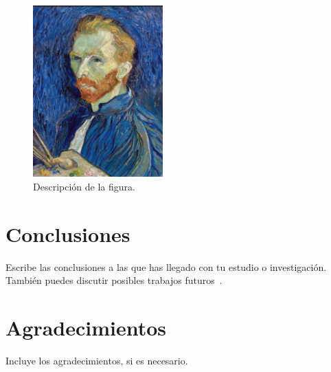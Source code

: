\begin{figure}[htbp]
  \centering
  \includegraphics[width=5cm]{./assets/images/ejemplo.png} %
  \caption{Descripción de la figura.}
  \label{fig:ejemplo}
\end{figure}

\section{Conclusiones}
Escribe las conclusiones a las que has llegado con tu estudio o investigación. También puedes discutir posibles trabajos futuros~\cite{knuth1997art}.

\section*{Agradecimientos}
Incluye los agradecimientos, si es necesario.

